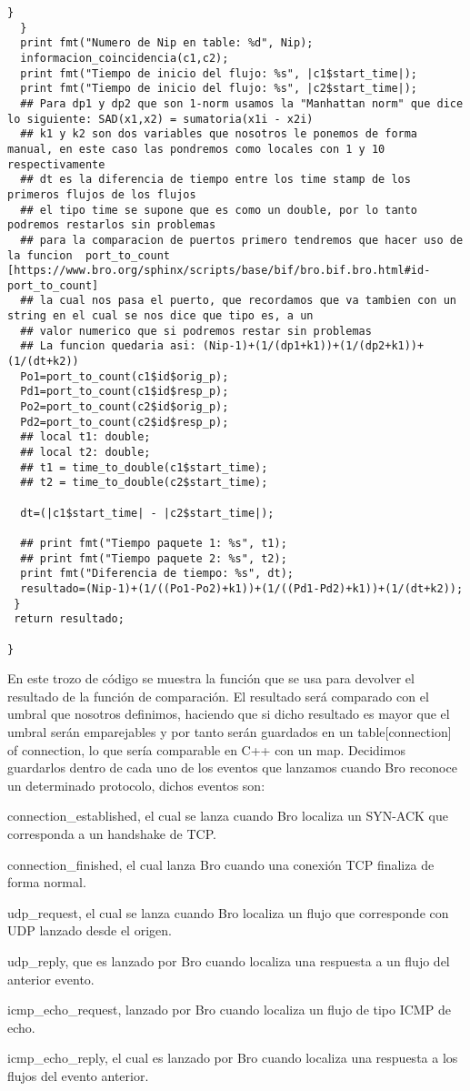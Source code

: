 \begin{lstlisting}[language=Consola]
    }
  }
  print fmt("Numero de Nip en table: %d", Nip);
  informacion_coincidencia(c1,c2);
  print fmt("Tiempo de inicio del flujo: %s", |c1$start_time|);
  print fmt("Tiempo de inicio del flujo: %s", |c2$start_time|);
  ## Para dp1 y dp2 que son 1-norm usamos la "Manhattan norm" que dice lo siguiente: SAD(x1,x2) = sumatoria(x1i - x2i)
  ## k1 y k2 son dos variables que nosotros le ponemos de forma manual, en este caso las pondremos como locales con 1 y 10 respectivamente
  ## dt es la diferencia de tiempo entre los time stamp de los primeros flujos de los flujos
  ## el tipo time se supone que es como un double, por lo tanto podremos restarlos sin problemas
  ## para la comparacion de puertos primero tendremos que hacer uso de la funcion  port_to_count [https://www.bro.org/sphinx/scripts/base/bif/bro.bif.bro.html#id-port_to_count]
  ## la cual nos pasa el puerto, que recordamos que va tambien con un string en el cual se nos dice que tipo es, a un
  ## valor numerico que si podremos restar sin problemas
  ## La funcion quedaria asi: (Nip-1)+(1/(dp1+k1))+(1/(dp2+k1))+(1/(dt+k2))
  Po1=port_to_count(c1$id$orig_p);
  Pd1=port_to_count(c1$id$resp_p);
  Po2=port_to_count(c2$id$orig_p);
  Pd2=port_to_count(c2$id$resp_p);
  ## local t1: double;
  ## local t2: double;
  ## t1 = time_to_double(c1$start_time);
  ## t2 = time_to_double(c2$start_time);

  dt=(|c1$start_time| - |c2$start_time|);

  ## print fmt("Tiempo paquete 1: %s", t1);
  ## print fmt("Tiempo paquete 2: %s", t2);
  print fmt("Diferencia de tiempo: %s", dt);
  resultado=(Nip-1)+(1/((Po1-Po2)+k1))+(1/((Pd1-Pd2)+k1))+(1/(dt+k2));
 }
 return resultado;

}
\end{lstlisting}
En este trozo de código se muestra la función que se usa para devolver 
el resultado de la función de comparación. El resultado será comparado 
con el umbral que nosotros definimos, haciendo que si dicho resultado 
es mayor que el umbral serán emparejables y por tanto serán guardados 
en un table[connection] of connection, lo que sería comparable en C++ 
con un map. Decidimos guardarlos dentro de cada uno de los eventos que 
lanzamos cuando Bro reconoce un determinado protocolo, dichos eventos son:
\intro
\begin{itemsize}
\item connection_established, el cual se lanza cuando Bro localiza un SYN-ACK que corresponda a un handshake de TCP.
\item connection_finished, el cual lanza Bro cuando una conexión TCP finaliza de forma normal. 
\item udp_request, el cual se lanza cuando Bro localiza un flujo que corresponde con UDP lanzado desde el origen.
\item udp_reply, que es lanzado por Bro cuando localiza una respuesta a un flujo del anterior evento.
\item icmp_echo_request, lanzado por Bro cuando localiza un flujo de tipo ICMP de echo.
\item icmp_echo_reply, el cual es lanzado por Bro cuando localiza una respuesta a los flujos del evento anterior.
\end{itemsize}
